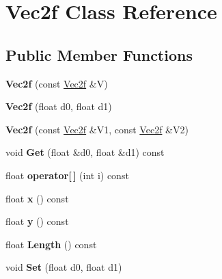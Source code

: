 \hypertarget{classVec2f}{\section{\-Vec2f \-Class \-Reference}
\label{classVec2f}
}
\subsection*{\-Public \-Member \-Functions}
\begin{DoxyCompactItemize}
\item 
\hypertarget{classVec2f_a1ccd068b35746d18e32a4eace483f6a8}{{\bfseries \-Vec2f} (const \hyperlink{classVec2f}{\-Vec2f} \&\-V)}\label{classVec2f_a1ccd068b35746d18e32a4eace483f6a8}

\item 
\hypertarget{classVec2f_ad05e55e211dd1b8e074f3d7d885702b9}{{\bfseries \-Vec2f} (float d0, float d1)}\label{classVec2f_ad05e55e211dd1b8e074f3d7d885702b9}

\item 
\hypertarget{classVec2f_a3d38f3909d8afebe49d445bce2222f95}{{\bfseries \-Vec2f} (const \hyperlink{classVec2f}{\-Vec2f} \&\-V1, const \hyperlink{classVec2f}{\-Vec2f} \&\-V2)}\label{classVec2f_a3d38f3909d8afebe49d445bce2222f95}

\item 
\hypertarget{classVec2f_a9fae265c16db131c066c14f73612eeeb}{void {\bfseries \-Get} (float \&d0, float \&d1) const }\label{classVec2f_a9fae265c16db131c066c14f73612eeeb}

\item 
\hypertarget{classVec2f_a289c043da9eeb8b3d2b6431d0e503d7b}{float {\bfseries operator\mbox{[}$\,$\mbox{]}} (int i) const }\label{classVec2f_a289c043da9eeb8b3d2b6431d0e503d7b}

\item 
\hypertarget{classVec2f_afa3f111d472b59c28e1d16085672a486}{float {\bfseries x} () const }\label{classVec2f_afa3f111d472b59c28e1d16085672a486}

\item 
\hypertarget{classVec2f_a95deeb91f6b67910e012afc23e1bee5a}{float {\bfseries y} () const }\label{classVec2f_a95deeb91f6b67910e012afc23e1bee5a}

\item 
\hypertarget{classVec2f_a4ff073e7f62ee4099033dc000cede267}{float {\bfseries \-Length} () const }\label{classVec2f_a4ff073e7f62ee4099033dc000cede267}

\item 
\hypertarget{classVec2f_a33fda3509f836bd7edb439dd1704560d}{void {\bfseries \-Set} (float d0, float d1)}\label{classVec2f_a33fda3509f836bd7edb439dd1704560d}


\end{DoxyCompactItemize}
